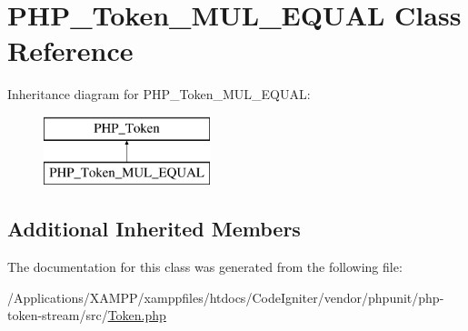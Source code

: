 \hypertarget{class_p_h_p___token___m_u_l___e_q_u_a_l}{}\section{P\+H\+P\+\_\+\+Token\+\_\+\+M\+U\+L\+\_\+\+E\+Q\+U\+AL Class Reference}
\label{class_p_h_p___token___m_u_l___e_q_u_a_l}
Inheritance diagram for P\+H\+P\+\_\+\+Token\+\_\+\+M\+U\+L\+\_\+\+E\+Q\+U\+AL\+:\begin{figure}[H]
\begin{center}
\leavevmode
\includegraphics[height=2.000000cm]{class_p_h_p___token___m_u_l___e_q_u_a_l}
\end{center}
\end{figure}
\subsection*{Additional Inherited Members}


The documentation for this class was generated from the following file\+:\begin{DoxyCompactItemize}
\item 
/\+Applications/\+X\+A\+M\+P\+P/xamppfiles/htdocs/\+Code\+Igniter/vendor/phpunit/php-\/token-\/stream/src/\mbox{\hyperlink{_token_8php}{Token.\+php}}\end{DoxyCompactItemize}
